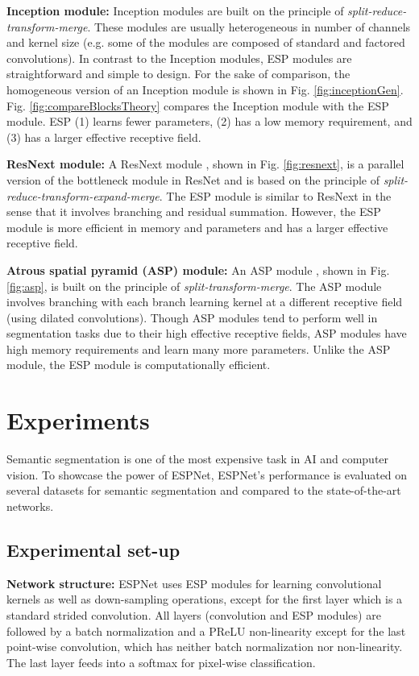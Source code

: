 \documentclass[runningheads]{llncs}
\def\Fig{Fig. }
\begin{document}
\noindent \textbf{Inception module:} Inception modules \cite{szegedy2015going,szegedy2016rethinking,SzegedyIV16InceptionV4} are built on the principle of \textit{split-reduce-transform-merge}. These modules are usually heterogeneous in number of channels and kernel size (e.g. some of the modules are composed of standard and factored convolutions). In contrast to the Inception modules, ESP modules are straightforward and simple to design. For the sake of comparison, the homogeneous version of an Inception module is shown in \Fig \ref{fig:inceptionGen}. \Fig \ref{fig:compareBlocksTheory} compares the Inception module with the ESP module. ESP (1) learns fewer parameters, (2) has a low memory requirement, and (3) has a larger effective receptive field.

\noindent \textbf{ResNext module:} A ResNext module \cite{xie2017aggregated}, shown in \Fig \ref{fig:resnext}, is a parallel version of the bottleneck module in ResNet \cite{he2016deep} and is based on the principle of \textit{split-reduce-transform-expand-merge}. The ESP module is similar to ResNext in the sense that it involves branching and residual summation. However, the ESP module is more efficient in memory and parameters and has a larger effective receptive field.

\vspace{1mm}
\noindent \textbf{Atrous spatial pyramid (ASP) module:}  An ASP module \cite{chen2016deeplab}, shown in \Fig \ref{fig:asp}, is built on the principle of \textit{split-transform-merge}. The ASP module involves branching with each branch learning kernel at a different receptive field (using dilated convolutions). Though ASP modules tend to perform well in segmentation tasks due to their high effective receptive fields, ASP modules have high memory requirements and learn many more parameters. Unlike the ASP module, the ESP module is computationally efficient.

\section{Experiments}
Semantic segmentation is one of the most expensive task in AI and computer vision. To showcase the power of ESPNet, ESPNet's performance is evaluated on several datasets for semantic segmentation and compared to the state-of-the-art networks.   

\subsection{Experimental set-up}
\noindent \textbf{Network structure:} ESPNet uses ESP modules for learning convolutional kernels as well as down-sampling operations, except for the first layer which is a standard strided convolution. All layers (convolution and ESP modules) are followed by a batch normalization \cite{ioffe2015batch} and a PReLU \cite{he2015delving} non-linearity except for the last point-wise convolution, which has neither batch normalization nor non-linearity. The last layer feeds into a softmax for pixel-wise classification. 
\end{document}
